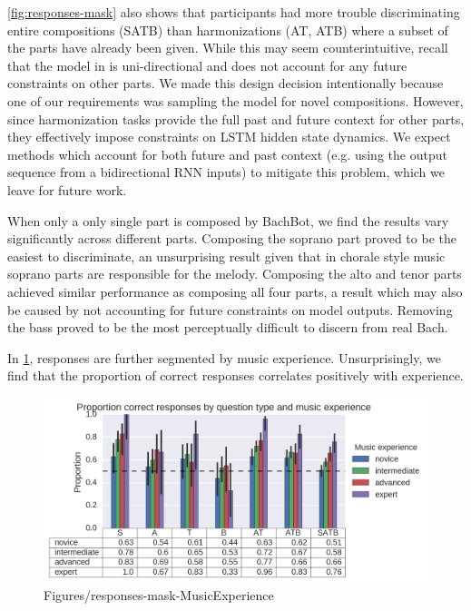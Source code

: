 \documentclass[dissertation.tex]{subfiles}
\begin{document}
\cref{fig:responses-mask} also shows that participants had more trouble
discriminating entire compositions (SATB) than harmonizations (AT, ATB) where a
subset of the parts have already been given. While this may seem
counterintuitive, recall that the model in  is uni-directional
and does not account for any future constraints on other parts. We made
this design decision intentionally because one of our requirements was sampling
the model for novel compositions. However, since harmonization tasks provide
the full past and future context for other parts, they effectively impose constraints
on LSTM hidden state dynamics. We expect methods which account for both future and past
context (e.g. using the output sequence from a bidirectional RNN inputs)
to mitigate this problem, which we leave for future work.

When only a only single part is composed by BachBot, we find the results vary significantly
across different parts. Composing the soprano part proved to be the easiest to
discriminate, an unsurprising result given that in chorale style music soprano parts
are responsible for the melody. Composing the alto and tenor parts achieved
similar performance as composing all four parts, a result which may also be caused by
not accounting for future constraints on model outputs. Removing the bass proved
to be the most perceptually difficult to discern from real Bach.

In \cref{fig:responses-mask-musicExperience}, responses are further segmented
by music experience. Unsurprisingly, we find that the proportion of correct responses
correlates positively with experience.

\begin{figure}[htpb]
  \centering
  \includegraphics[width=1.0\textwidth]{Figures/responses-mask-musicExperience.png}
  \caption{Figures/responses-mask-MusicExperience}
  \label{fig:responses-mask-musicExperience}
\end{figure}
\end{document}
